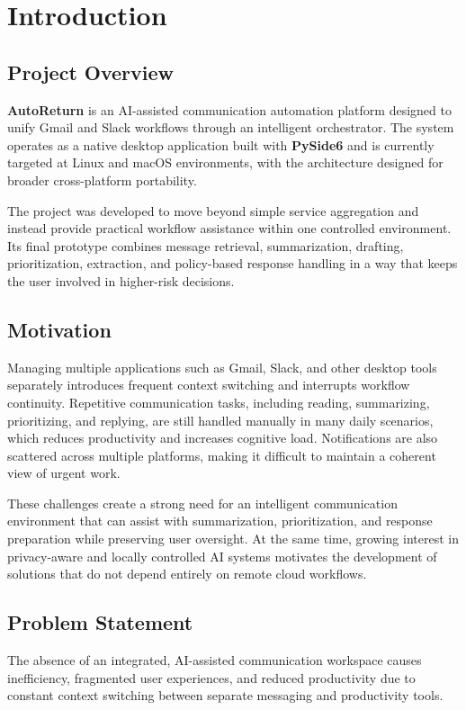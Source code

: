 \chapter{Introduction}
\label{sec:introduction}

\section{Project Overview}
\textbf{AutoReturn} is an AI-assisted communication automation platform designed to unify Gmail and Slack workflows through an intelligent orchestrator. The system operates as a native desktop application built with \textbf{PySide6} and is currently targeted at Linux and macOS environments, with the architecture designed for broader cross-platform portability.

The project was developed to move beyond simple service aggregation and instead provide practical workflow assistance within one controlled environment. Its final prototype combines message retrieval, summarization, drafting, prioritization, extraction, and policy-based response handling in a way that keeps the user involved in higher-risk decisions.

\section{Motivation}
Managing multiple applications such as Gmail, Slack, and other desktop tools separately introduces frequent context switching and interrupts workflow continuity. Repetitive communication tasks, including reading, summarizing, prioritizing, and replying, are still handled manually in many daily scenarios, which reduces productivity and increases cognitive load. Notifications are also scattered across multiple platforms, making it difficult to maintain a coherent view of urgent work.

These challenges create a strong need for an intelligent communication environment that can assist with summarization, prioritization, and response preparation while preserving user oversight. At the same time, growing interest in privacy-aware and locally controlled AI systems motivates the development of solutions that do not depend entirely on remote cloud workflows.

\section{Problem Statement}
The absence of an integrated, AI-assisted communication workspace causes inefficiency, fragmented user experiences, and reduced productivity due to constant context switching between separate messaging and productivity tools.

